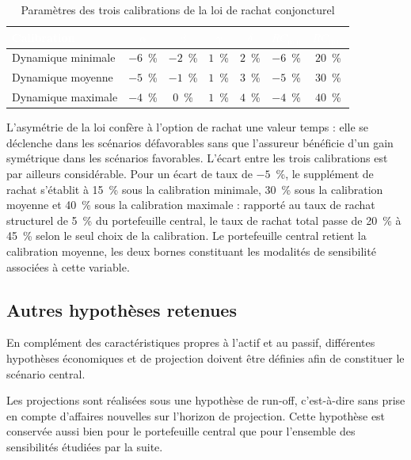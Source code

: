\begin{table}[H]
  \centering
  \small
  \renewcommand{\arraystretch}{1.3}
  \setlength{\tabcolsep}{9pt}
  \begin{tabular}{lcccccc}
    \toprule
    \rowcolor{rougeEnt}
    \textcolor{white}{\textbf{Calibration}} &
    \textcolor{white}{\textbf{$\alpha$}} &
    \textcolor{white}{\textbf{$\beta$}} &
    \textcolor{white}{\textbf{$\gamma$}} &
    \textcolor{white}{\textbf{$\delta$}} &
    \textcolor{white}{\textbf{$RC_{\min}$}} &
    \textcolor{white}{\textbf{$RC_{\max}$}} \\
    \midrule
    Dynamique minimale & $-6$~\% & $-2$~\% & $1$~\% & $2$~\% & $-6$~\% & $20$~\% \\
    \rowcolor{grisClair}
    Dynamique moyenne  & $-5$~\% & $-1$~\% & $1$~\% & $3$~\% & $-5$~\% & $30$~\% \\
    Dynamique maximale & $-4$~\% & $0$~\%  & $1$~\% & $4$~\% & $-4$~\% & $40$~\% \\
    \bottomrule
  \end{tabular}
  \caption{Paramètres des trois calibrations de la loi de rachat conjoncturel}
  \label{tab:loi-rachat-conjoncturel}
\end{table}

L'asymétrie de la loi confère à l'option de rachat une valeur temps : elle se déclenche dans
les scénarios défavorables sans que l'assureur bénéficie d'un gain symétrique dans les
scénarios favorables. L'écart entre les trois calibrations est par ailleurs considérable.
Pour un écart de taux de $-5$~\%, le supplément de rachat s'établit à 15~\% sous la
calibration minimale, 30~\% sous la calibration moyenne et 40~\% sous la calibration
maximale : rapporté au taux de rachat structurel de 5~\% du portefeuille central, le taux de
rachat total passe de 20~\% à 45~\% selon le seul choix de la calibration. Le portefeuille
central retient la calibration moyenne, les deux bornes constituant les modalités de
sensibilité associées à cette variable.

\subsection{Autres hypothèses retenues}

En complément des caractéristiques propres à l'actif et au passif, différentes hypothèses économiques et de projection doivent être définies afin de constituer le scénario central.

Les projections sont réalisées sous une hypothèse de run-off, c'est-à-dire sans prise en compte d'affaires nouvelles sur l'horizon de projection. Cette hypothèse est conservée aussi bien pour le portefeuille central que pour l'ensemble des sensibilités étudiées par la suite.

